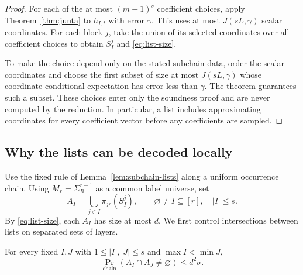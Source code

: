 \begin{proof}
For each of the at most $(m+1)^s$ coefficient choices, apply
Theorem~\ref{thm:junta} to $h_{I,t}$ with error $\gamma$.
This uses at most $J(sL,\gamma)$ scalar coordinates.
For each block $j$, take the union of its selected coordinates over
all coefficient choices to obtain $S_I^j$ and \eqref{eq:list-size}.

To make the choice depend only on the stated subchain data, order the
scalar coordinates and choose the first subset of size at most
$J(sL,\gamma)$ whose coordinate conditional expectation has error
less than $\gamma$. The theorem guarantees such a subset.
These choices enter only the soundness proof and are never computed
by the reduction. In particular, a list includes approximating
coordinates for every coefficient vector before any coefficients
are sampled.
\end{proof}

\subsection{Why the lists can be decoded locally}

Use the fixed rule of Lemma~\ref{lem:subchain-lists} along a uniform
occurrence chain.
Using $M_r=\Sigma_R^{r-1}$ as a common label universe, set
\begin{equation}\label{eq:terminal-lists}
 A_I=\bigcup_{j\in I}\pi_{jr}(S_I^j),
 \qquad \varnothing\ne I\subseteq[r],\quad |I|\le s.
\end{equation}
By \eqref{eq:list-size}, each $A_I$ has size at most $d$.
We first control intersections between lists on separated sets of layers.

\begin{lemma}\label{lem:separated-lists}
For every fixed $I,J$ with $1\le|I|,|J|\le s$ and
$\max I<\min J$,
\[
 \Pr_{\text{chain}}(A_I\cap A_J\ne\varnothing)\le d^2\sigma.
\]
\end{lemma}

